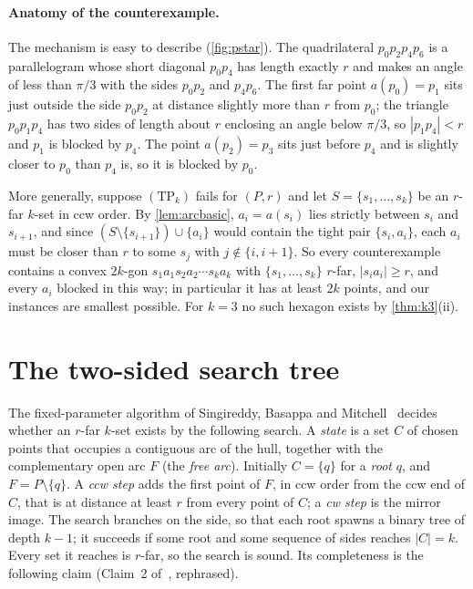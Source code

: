 \documentclass[11pt,a4paper]{article}
\theoremstyle{definition}
\theoremstyle{remark}
\begin{document}
\paragraph{Anatomy of the counterexample.}
The mechanism is easy to describe (\cref{fig:pstar}). The quadrilateral
$p_0p_2p_4p_6$ is a parallelogram whose short diagonal $p_0p_4$ has length
exactly $r$ and makes an angle of less than $\pi/3$ with the sides $p_0p_2$
and $p_4p_6$. The first far point $a(p_0)=p_1$ sits just outside the side
$p_0p_2$ at distance slightly more than $r$ from $p_0$; the triangle
$p_0p_1p_4$ has two sides of length about $r$ enclosing an angle below
$\pi/3$, so $|p_1p_4|<r$ and $p_1$ is blocked by $p_4$. The point
$a(p_2)=p_3$ sits just before $p_4$ and is slightly closer to $p_0$ than
$p_4$ is, so it is blocked by $p_0$.

More generally, suppose $(\mathrm{TP}_k)$ fails for $(P,r)$ and let
$S=\{s_1,\dots,s_k\}$ be an $r$-far $k$-set in ccw order. By
\cref{lem:arcbasic}, $a_i=a(s_i)$ lies strictly between $s_i$ and $s_{i+1}$,
and since $(S\setminus\{s_{i+1}\})\cup\{a_i\}$ would contain the tight pair
$\{s_i,a_i\}$, each $a_i$ must be closer than $r$ to some $s_j$ with
$j\notin\{i,i+1\}$. So every counterexample contains a convex $2k$-gon
$s_1a_1s_2a_2\cdots s_ka_k$ with $\{s_1,\dots,s_k\}$ $r$-far, $|s_ia_i|\ge r$,
and every $a_i$ blocked in this way; in particular it has at least $2k$
points, and our instances are smallest possible. For $k=3$ no such hexagon
exists by \cref{thm:k3}(ii).


\section{The two-sided search tree}\label{sec:sbm}

The fixed-parameter algorithm of Singireddy, Basappa and Mitchell~\cite{sbm}
decides whether an $r$-far $k$-set exists by the following search. A
\emph{state} is a set $C$ of chosen points that occupies a contiguous arc of
the hull, together with the complementary open arc $F$ (the \emph{free arc}).
Initially $C=\{q\}$ for a \emph{root} $q$, and $F=P\setminus\{q\}$. A
\emph{ccw step} adds the first point of $F$, in ccw order from the ccw end of
$C$, that is at distance at least $r$ from every point of $C$; a \emph{cw
step} is the mirror image. The search branches on the side, so that each root
spawns a binary tree of depth $k-1$; it succeeds if some root and some
sequence of sides reaches $|C|=k$. Every set it reaches is $r$-far, so the
search is sound. Its completeness is the following claim (Claim~2
of~\cite{sbm}, rephrased).
\end{document}
